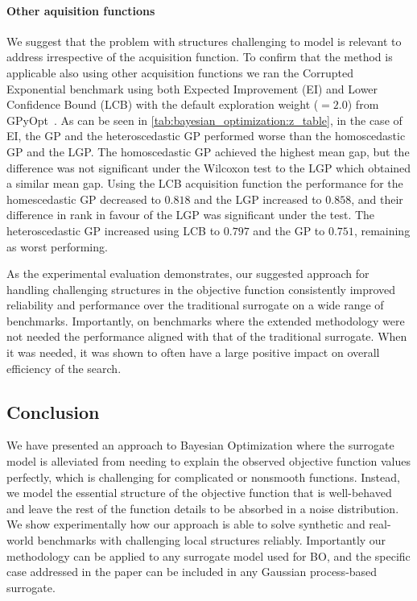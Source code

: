 \paragraph{Other aquisition functions} We suggest that the problem with structures challenging to model is relevant to address irrespective of the acquisition function.
To confirm that the method is applicable also using other acquisition functions we ran the Corrupted Exponential benchmark
using both Expected Improvement (EI) and Lower Confidence Bound (LCB) with the default exploration weight ($=2.0$) from GPyOpt~\parencite{gpyopt_gpyopt_2016}.
As can be seen in \cref{tab:bayesian_optimization:z_table}, in the case of EI, the GP and the heteroscedastic GP performed worse than the homoscedastic GP and the LGP.
The homoscedastic GP achieved the highest mean gap, but the difference was not significant under the Wilcoxon test to the LGP which obtained a similar mean gap.
Using the LCB acquisition function the performance for the homescedastic GP decreased to $0.818$ and the LGP increased to $0.858$,
and their difference in rank in favour of the LGP was significant under the test.
The heteroscedastic GP increased using LCB to $0.797$ and the GP to $0.751$, remaining as worst performing.

As the experimental evaluation demonstrates,
our suggested approach for handling challenging structures in the objective function consistently improved reliability and performance
over the traditional surrogate on a wide range of benchmarks.
Importantly, on benchmarks where the extended methodology were not needed the performance aligned with that of the traditional surrogate.
When it was needed, it was shown to often have a large positive impact on overall efficiency of the search.

\subsection{Conclusion}
We have presented an approach to Bayesian Optimization where the surrogate model is alleviated from needing to explain the observed objective function values perfectly,
which is challenging for complicated or nonsmooth functions.
Instead, we model the essential structure of the objective function that is well-behaved and leave the rest of the function details to be absorbed in a noise distribution.
We show experimentally how our approach is able to solve synthetic and real-world benchmarks with challenging local structures reliably.
Importantly our methodology can be applied to any surrogate model used for BO,
and the specific case addressed in the paper can be included in any Gaussian process-based surrogate.



